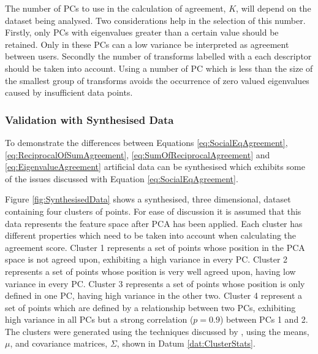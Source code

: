 			The number of PCs to use in the calculation of agreement, $K$, will depend on the dataset being
			analysed. Two considerations help in the selection of this number. Firstly, only PCs with
			eigenvalues greater than a certain value should be retained. Only in these PCs can a low variance
			be interpreted as agreement between users. Secondly the number of transforms labelled with a each
			descriptor should be taken into account. Using a number of PC which is less than the size of the
			smallest group of transforms avoids the occurrence of zero valued eigenvalues caused by
			insufficient data points.

		\subsubsection*{Validation with Synthesised Data}
			To demonstrate the differences between Equations \ref{eq:SocialEqAgreement},
			\ref{eq:ReciprocalOfSumAgreement}, \ref{eq:SumOfReciprocalAgreement} and
			\ref{eq:EigenvalueAgreement} artificial data can be synthesised which exhibits some of the issues
			discussed with Equation \ref{eq:SocialEqAgreement}.
			
			Figure \ref{fig:SynthesisedData} shows a synthesised, three dimensional, dataset containing four
			clusters of points. For ease of discussion it is assumed that this data represents the feature
			space after PCA has been applied. Each cluster has different properties which need to be taken into
			account when calculating the agreement score. Cluster 1 represents a set of points whose position
			in the PCA space is not agreed upon, exhibiting a high variance in every PC. Cluster 2 represents a
			set of points whose position is very well agreed upon, having low variance in every PC. Cluster 3
			represents a set of points whose position is only defined in one PC, having high variance in the
			other two. Cluster 4 represent a set of points which are defined by a relationship between two PCs,
			exhibiting high variance in all PCs but a strong correlation ($p = 0.9$) between PCs 1 and 2. The
			clusters were generated using the techniques discussed by \citet{ripley1987stochastic}, using the
			means, $\mu$, and covariance matrices, $\Sigma$, shown in Datum \ref{dat:ClusterStats}.

